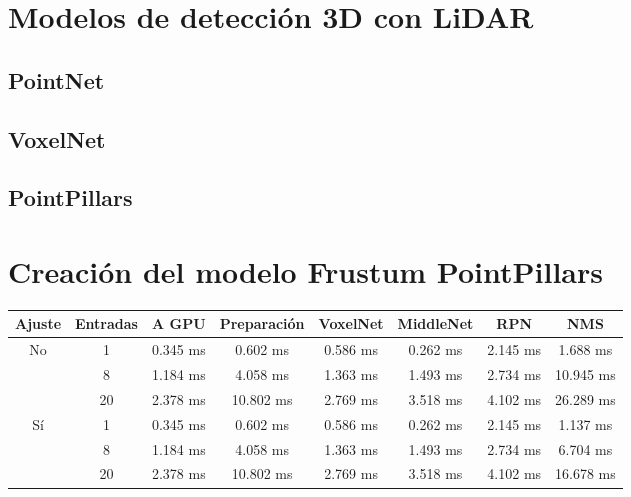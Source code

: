 \section{Modelos de detección 3D con LiDAR}
\label{sec:Modelos de detección 3D con LiDAR}

\subsection{PointNet}
\label{sec:PointNet}

\subsection{VoxelNet}
\label{sec:VoxelNet}

\subsection{PointPillars}
\label{sec:PointPillars}


\section{Creación del modelo Frustum PointPillars}
\label{sec:Creación del modelo Frustum PointPillars}

\begin{table}[H]
\begin{tabular}{|c|c|c|c|c|c|c|c|}
\hline
\textbf{Ajuste} & \textbf{Entradas} & \textbf{A GPU} & \textbf{Preparación} & \textbf{VoxelNet} & \textbf{MiddleNet} & \textbf{RPN} & \textbf{NMS} \\ \hline \hline
\multirow{3}{*}{No} & 1  & 0.345 ms & 0.602 ms  & 0.586 ms & 0.262 ms & 2.145 ms & 1.688 ms  \\ \cline{2-8} 
                    & 8  & 1.184 ms & 4.058 ms  & 1.363 ms & 1.493 ms & 2.734 ms & 10.945 ms \\ \cline{2-8} 
                    & 20 & 2.378 ms & 10.802 ms & 2.769 ms & 3.518 ms & 4.102 ms & 26.289 ms \\ \hline
\multirow{3}{*}{Sí} & 1  & 0.345 ms & 0.602 ms  & 0.586 ms & 0.262 ms & 2.145 ms & 1.137 ms  \\ \cline{2-8} 
                    & 8  & 1.184 ms & 4.058 ms  & 1.363 ms & 1.493 ms & 2.734 ms & 6.704 ms  \\ \cline{2-8} 
                    & 20 & 2.378 ms & 10.802 ms & 2.769 ms & 3.518 ms & 4.102 ms & 16.678 ms \\ \hline
\end{tabular}
\end{table}

